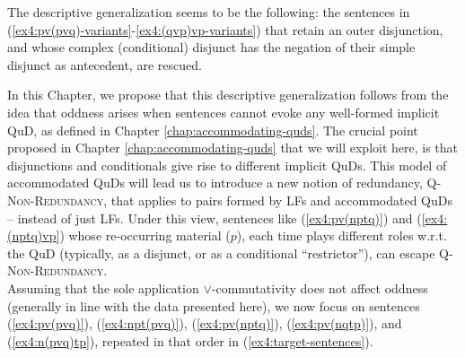 The descriptive generalization seems to be the following: the sentences in (\ref{ex4:pv(pvq)-variants}-\ref{ex4:(qvp)vp-variants}) that retain an outer disjunction, and whose complex (conditional) disjunct has the negation of their simple disjunct as antecedent, are rescued.



In this Chapter, we propose that this descriptive generalization follows from the idea that oddness arises when sentences cannot evoke any well-formed implicit QuD, as defined in Chapter \ref{chap:accommodating-quds}. The crucial point proposed in Chapter \ref{chap:accommodating-quds}  that we will exploit here, is that disjunctions and conditionals give rise to different implicit QuDs. This model of accommodated QuDs will lead us to introduce a new notion of redundancy, \textsc{Q-Non-Redundancy}, that applies to pairs formed by LFs and accommodated QuDs -- instead of just LFs. Under this view, sentences like (\ref{ex4:pv(nptq)}) and (\ref{ex4:(nptq)vp}) whose re-occurring material ($p$), each time plays different roles w.r.t. the QuD (typically, as a disjunct, or as a conditional ``restrictor''), can escape \textsc{Q-Non-Redundancy}.\\


Assuming that the sole application $\vee$-commutativity does not affect oddness (generally in line with the data presented here), we now focus on sentences (\ref{ex4:pv(pvq)}), (\ref{ex4:npt(pvq)}), (\ref{ex4:pv(nptq)}), (\ref{ex4:pv(nqtp)}), and (\ref{ex4:n(pvq)tp}), repeated in that order in (\ref{ex4:target-sentences}).
\begin{exe}
	\ex \label{ex4:target-sentences}
	\begin{xlist}
		\label{ex4:pv(pvq)-repeated}
		\label{ex4:npt(pvq)-repeated}
		\label{ex4:pv(nptq)-repeated}
		\label{ex4:pv(nqtp)-repeated}
		\label{ex4:n(pvq)tp-repeated}
	\end{xlist}
\end{exe}


